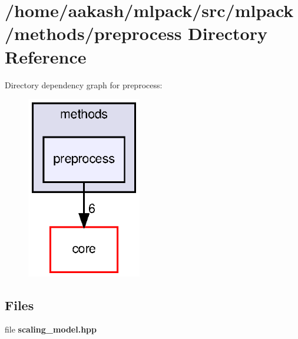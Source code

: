 \section{/home/aakash/mlpack/src/mlpack/methods/preprocess Directory Reference}
\label{dir_a6ed30637418546327b62aaa44248cce}
Directory dependency graph for preprocess\+:
\nopagebreak
\begin{figure}[H]
\begin{center}
\leavevmode
\includegraphics[width=142pt]{dir_a6ed30637418546327b62aaa44248cce_dep}
\end{center}
\end{figure}
\subsection*{Files}
\begin{DoxyCompactItemize}
\item 
file \textbf{ scaling\+\_\+model.\+hpp}
\end{DoxyCompactItemize}
